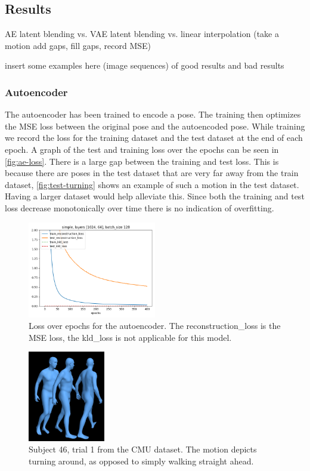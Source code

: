 \subsection{Results}\label{subsec:results}
AE latent blending vs. VAE latent blending vs. linear interpolation (take a motion add gaps, fill gaps, record MSE)

insert some examples here (image sequences) of good results and bad results

\subsubsection{Autoencoder}\label{subsubsec:autoencoder}
The autoencoder has been trained to encode a pose. The training then optimizes the MSE loss between the original pose and the autoencoded pose. While training we record the loss for the training dataset and the test dataset at the end of each epoch. A graph of the test and training loss over the epochs can be seen in \autoref{fig:ae-loss}. There is a large gap between the training and test loss. This is because there are poses in the test dataset that are very far away from the train dataset, \autoref{fig:test-turning} shows an example of such a motion in the test dataset. Having a larger dataset would help alleviate this. Since both the training and test loss decrease monotonically over time there is no indication of overfitting.

\begin{figure}[h]
\centering
\includegraphics[width=0.5\textwidth]{img/simple_1024-64_batch-128_losses}
\caption{Loss over epochs for the autoencoder. The reconstruction\_loss is the MSE loss, the kld\_loss is not applicable for this model.}
\label{fig:ae-loss}
\end{figure}

\begin{figure}[h]
\centering
\includegraphics[width=0.3\textwidth]{img/46_01_turning}
\caption{Subject 46, trial 1 from the CMU dataset. The motion depicts turning around, as opposed to simply walking straight ahead.}
\label{fig:test-turning}
\end{figure}




